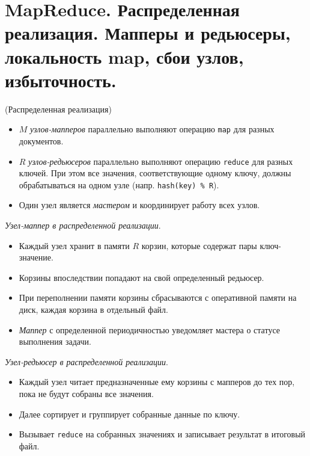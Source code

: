 \section{MapReduce. Распределенная реализация. Мапперы и редьюсеры, локальность
  map, сбои узлов, избыточность.}

\begin{algorithm}(Распределенная реализация)
  \begin{itemize}
    \item $M$ \textit{узлов-мапперов} параллельно выполняют операцию
      \texttt{map} для разных документов.
    \item $R$ \textit{узлов-редьюсеров} параллельно выполняют операцию
      \texttt{reduce} для разных ключей. При этом все значения,
      соответствующие одному ключу, должны обрабатываться на одном узле
      (напр. \texttt{hash(key) \% R}).
    \item Один узел является \textit{мастером} и координирует работу всех
      узлов.
  \end{itemize}
\end{algorithm}

\begin{definition}
  \textit{Узел-маппер в распределенной реализации}.
  \begin{itemize}
    \item Каждый узел хранит в памяти $R$ корзин, которые содержат пары ключ-значение.
    \item Корзины впоследствии попадают на свой определенный редьюсер.
    \item При переполнении памяти корзины сбрасываются с оперативной памяти на
      диск, каждая корзина в отдельный файл.
    \item \textit{Маппер} с определенной периодичностью уведомляет мастера о
      статусе выполнения задачи.
  \end{itemize}
\end{definition}

\begin{definition}
  \textit{Узел-редьюсер в распределенной реализации}.
  \begin{itemize}
    \item Каждый узел читает предназначенные ему корзины с мапперов до тех пор, пока не
      будут собраны все значения.
    \item Далее сортирует и группирует собранные данные по ключу.
    \item Вызывает \texttt{reduce} на собранных значениях и записывает результат
      в итоговый файл.
  \end{itemize}
\end{definition}

